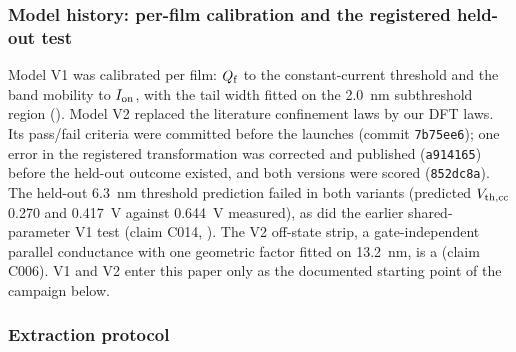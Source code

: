 \subsubsection{Model history: per-film calibration and the registered held-out test}
\label{sec:m-tcad-history}

Model V1 was calibrated per film: $Q_{\mathrm{f}}$ to the constant-current threshold and the band mobility to $I_{\mathrm{on}}$, with the
tail width fitted on the \SI{2.0}{nm} subthreshold region (). %
Model V2 replaced the literature confinement laws by our DFT laws. Its pass/fail criteria were committed before the
launches (commit \texttt{7b75ee6}); one error in the registered transformation was corrected and published
(\texttt{a914165}) before the held-out outcome existed, and both versions were scored (\texttt{852dc8a}). %
The held-out \SI{6.3}{nm} threshold prediction failed in both variants (predicted $V_{\mathrm{th,cc}}$ 0.270 and 0.417~V against
0.644~V measured), as did the earlier shared-parameter V1 test (claim C014, ). %
The V2 off-state strip, a gate-independent parallel conductance with one geometric factor fitted on \SI{13.2}{nm}, is
a  (claim C006). %
V1 and V2 enter this paper only as the documented starting point of the campaign below.

\subsubsection{Extraction protocol}
\label{sec:m-tcad-extraction}

